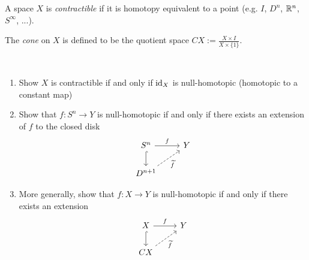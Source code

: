 \documentclass{article}[11pt]
\begin{document}
\begin{definition} A space $X$ is \textit{contractible} if it is homotopy equivalent to a point (e.g. $I$, $D^n$, $\mathbb{R}^n$, $S^\infty$, ...).
\end{definition}

\begin{definition} The \textit{cone} on $X$ is defined to be the quotient space $CX := \frac{X\times I}{X\times \{1\}}$.
\end{definition}


\begin{exercise} $\ $
\begin{enumerate}
	\item Show $X$ is contractible if and only if $\text{id}_X$ is null-homotopic (homotopic to a constant map)
	\item Show that $f: S^n \to Y$ is null-homotopic if and only if there exists an extension of $f$ to the closed disk
	\[
		\begin{tikzcd}
		S^n\rar["f"]\dar[hook] & Y \\
		D^{n+1}\ar[ur,dashed,"\widetilde{f}" below right] &
		\end{tikzcd}
	\]

	\item More generally, show that $f: X \to Y$ is null-homotopic if and only if there exists an extension
	\[
		\begin{tikzcd}
		X\rar["f"]\dar[hook] & Y \\
		CX\ar[ur,dashed,"\widetilde{f}" below right] &
		\end{tikzcd}
	\]
\end{enumerate}
\end{exercise}
\end{document}
